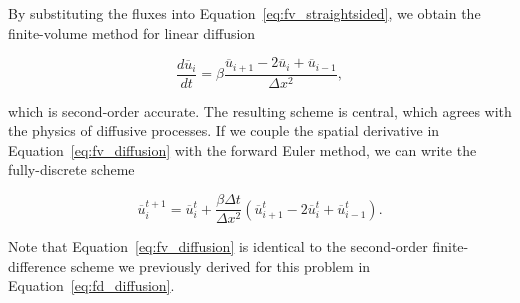 By substituting the fluxes into Equation~\ref{eq:fv_straightsided}, we obtain the finite-volume method for linear diffusion
\begin{eqBox}
 \begin{equation}
 \frac{d\overline u_i}{dt} = \beta \frac{\overline u_{i+1}-2\overline u_{i} + \overline u_{i-1}}{\Delta x^2},
	\label{eq:fv_diffusion}
 \end{equation}
\end{eqBox}
which is second-order accurate. The resulting scheme is central, which agrees with the physics of diffusive processes.  If we couple the spatial derivative in Equation~\ref{eq:fv_diffusion} with the forward Euler method, we can write the fully-discrete scheme
\begin{eqBox}
\begin{equation}
	\overline u_i^{t+1} = \overline u_i^t + \frac{\beta \Delta t}{\Delta x^2}  \left(\overline u_{i+1}^t-2\overline u_{i}^t + \overline u_{i-1}^t\right).
	\label{eq:fv_diffusion_fullydiscrete}
\end{equation}
\end{eqBox}
Note that Equation~\ref{eq:fv_diffusion} is identical to the second-order finite-difference scheme we previously derived for this problem in Equation~\ref{eq:fd_diffusion}.  
